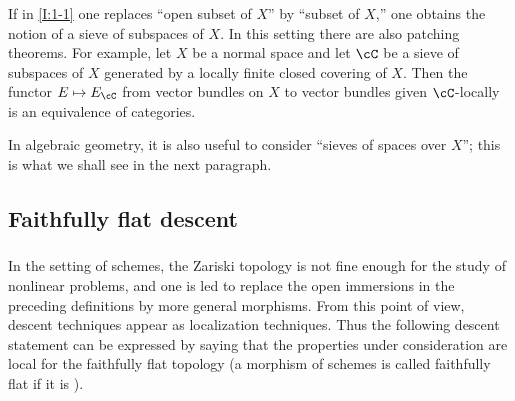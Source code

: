 \subsubsection{}\label{I:1-3-4}

If in \ref{I:1-1} one replaces “open subset of $X$” by “subset of $X$,”
one obtains the notion of a sieve of subspaces of $X$. In this setting
there are also patching theorems. For example, let $X$ be a normal space and
let $\cC$ be a sieve of subspaces of $X$ generated by a locally finite
closed covering of $X$. Then the functor $E\mapsto E_\cC$ from vector
bundles on $X$ to vector bundles given $\cC$-locally is an equivalence
of categories.

In algebraic geometry, it is also useful to consider “sieves of spaces
over $X$”; this is what we shall see in the next paragraph.

\subsection{Faithfully flat descent}\label{I:1-4}

\subsubsection{}\label{I:1-4-1}

In the setting of schemes, the Zariski topology is not fine enough for the
study of nonlinear problems, and one is led to replace the open immersions
in the preceding definitions by more general morphisms. From this point of
view, descent techniques appear as localization techniques. Thus the
following descent statement can be expressed by saying that the properties
under consideration are local for the faithfully flat topology (a morphism
of schemes is called faithfully flat if it is ).

